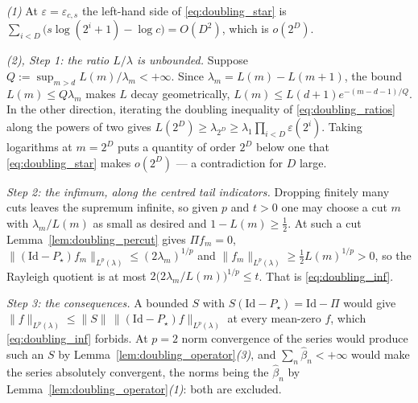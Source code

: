 \emph{(1)} At $\varepsilon=\varepsilon_{c,s}$ the left-hand side of \eqref{eq:doubling_star}
is $\sum_{i<D}\bigl(s\log(2^{i}+1)-\log c\bigr)=O(D^2)$, which is $o(2^{D})$.

\emph{(2), Step 1: the ratio $L/\lambda$ is unbounded.} Suppose
$Q:=\sup_{m>d}L(m)/\lambda_m<+\infty$. Since $\lambda_m=L(m)-L(m+1)$, the bound
$L(m)\leq Q\lambda_m$ makes $L$ decay geometrically, $L(m)\leq L(d+1)e^{-(m-d-1)/Q}$. In the
other direction, iterating the doubling inequality of \eqref{eq:doubling_ratios} along the
powers of two gives $L(2^{D})\geq\lambda_{2^{D}}\geq\lambda_1\prod_{i<D}\varepsilon(2^{i})$.
Taking logarithms at $m=2^{D}$ puts a quantity of order $2^{D}$ below one that
\eqref{eq:doubling_star} makes $o(2^{D})$ --- a contradiction for $D$ large.

\emph{Step 2: the infimum, along the centred tail indicators.} Dropping finitely many cuts
leaves the supremum infinite, so given $p$ and $t>0$ one may choose a cut $m$ with
$\lambda_m/L(m)$ as small as desired and $1-L(m)\geq\tfrac12$. At such a cut
Lemma~\ref{lem:doubling_percut} gives $\Pi f_m=0$,
$\|(\mathrm{Id}-P_\star)f_m\|_{L^p(\lambda)}\leq(2\lambda_m)^{1/p}$ and
$\|f_m\|_{L^p(\lambda)}\geq\tfrac12L(m)^{1/p}>0$, so the Rayleigh quotient is at most
$2\bigl(2\lambda_m/L(m)\bigr)^{1/p}\leq t$. That is \eqref{eq:doubling_inf}.

\emph{Step 3: the consequences.} A bounded $S$ with $S(\mathrm{Id}-P_\star)=\mathrm{Id}-\Pi$
would give $\|f\|_{L^p(\lambda)}\leq\|S\|\,\|(\mathrm{Id}-P_\star)f\|_{L^p(\lambda)}$ at every
mean-zero $f$, which \eqref{eq:doubling_inf} forbids. At $p=2$ norm convergence of the series
would produce such an $S$ by Lemma~\ref{lem:doubling_operator}\emph{(3)}, and
$\sum_n\widehat\beta_n<+\infty$ would make the series absolutely convergent, the norms being
the $\widehat\beta_n$ by Lemma~\ref{lem:doubling_operator}\emph{(1)}: both are excluded.
